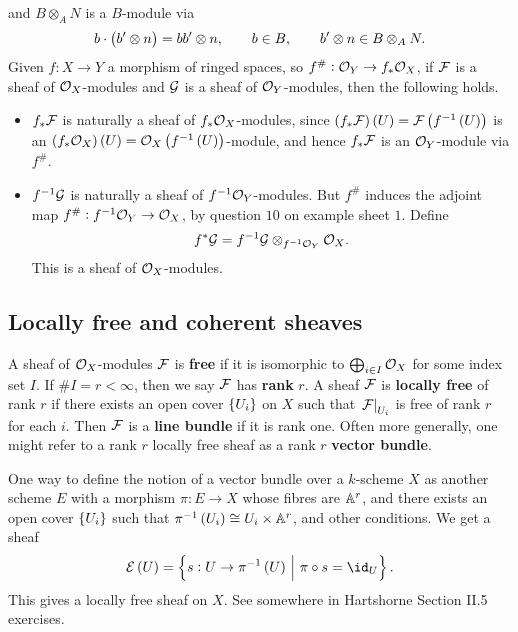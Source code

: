 \begin{definition*}
\begin{itemize}
and $ B \otimes_A N $ is a $ B $-module via
$$ b \cdot \br{b' \otimes n} = bb' \otimes n, \qquad b \in B, \qquad b' \otimes n \in B \otimes_A N. $$
Given $ f : X \to Y $ a morphism of ringed spaces, so $ f^\# : \OOO_Y \to f_*\OOO_X $, if $ \FFF $ is a sheaf of $ \OOO_X $-modules and $ \GGG $ is a sheaf of $ \OOO_Y $-modules, then the following holds.
\begin{itemize}
\item $ f_*\FFF $ is naturally a sheaf of $ f_*\OOO_X $-modules, since $ \br{f_*\FFF}\br{U} = \FFF\br{f^{-1}\br{U}} $ is an $ \br{f_*\OOO_X}\br{U} = \OOO_X\br{f^{-1}\br{U}} $-module, and hence $ f_*\FFF $ is an $ \OOO_Y $-module via $ f^\# $.
\item $ f^{-1}\GGG $ is naturally a sheaf of $ f^{-1}\OOO_Y $-modules. But $ f^\# $ induces the adjoint map $ f^\# : f^{-1}\OOO_Y \to \OOO_X $, by question $ 10 $ on example sheet $ 1 $. Define
$$ f^*\GGG = f^{-1}\GGG \otimes_{f^{-1}\OOO_Y} \OOO_X. $$
This is a sheaf of $ \OOO_X $-modules.
\end{itemize}
\end{itemize}
\end{definition*}

\subsection{Locally free and coherent sheaves}

\begin{definition*}
A sheaf of $ \OOO_X $-modules $ \FFF $ is \textbf{free} if it is isomorphic to $ \bigoplus_{i \in I} \OOO_X $ for some index set $ I $. If $ \#I = r < \infty $, then we say $ \FFF $ has \textbf{rank} $ r $. A sheaf $ \FFF $ is \textbf{locally free} of rank $ r $ if there exists an open cover $ \cbr{U_i} $ on $ X $ such that $ \eval{\FFF}_{U_i} $ is free of rank $ r $ for each $ i $. Then $ \FFF $ is a \textbf{line bundle} if it is rank one. Often more generally, one might refer to a rank $ r $ locally free sheaf as a rank $ r $ \textbf{vector bundle}.
\end{definition*}

\begin{remark*}
One way to define the notion of a vector bundle over a $ k $-scheme $ X $ as another scheme $ E $ with a morphism $ \pi : E \to X $ whose fibres are $ \AA^r $, and there exists an open cover $ \cbr{U_i} $ such that $ \pi^{-1}\br{U_i} \cong U_i \times \AA^r $, and other conditions. We get a sheaf
$$ \EEE\br{U} = \cbr{s : U \to \pi^{-1}\br{U} \st \pi \circ s = \id_U}. $$
This gives a locally free sheaf on $ X $. See somewhere in Hartshorne Section II.5 exercises.
\end{remark*}

